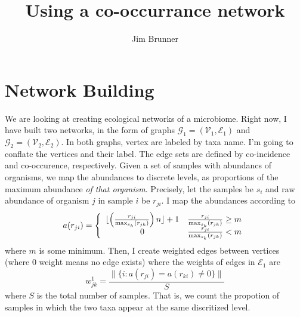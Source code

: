 \documentclass[10pt]{article}
\author{Jim Brunner}
\title{Using a co-occurrance network}
\theoremstyle{definition}
\numberwithin{theorem}{section}
\numberwithin{definition}{section}
\numberwithin{lemma}{section}
\numberwithin{corollary}{section}
\numberwithin{clm}{section}
\numberwithin{rmk}{section}
\newcommand{\cE}{\mathcal{E}}
\newcommand{\cG}{\mathcal{G}}
\newcommand{\cV}{\mathcal{V}}
\begin{document}
\maketitle
\section{Network Building}
We are looking at creating ecological networks of a microbiome. Right now, I have built two networks, in the form of graphs $\cG_1 = (\cV_1, \cE_1)$ and $\cG_2 = (\cV_2,\cE_2)$. In both graphs, vertex are labeled by taxa name. I'm going to conflate the vertices and their label. The edge sets are defined by co-incidence and co-occurence, respectively. Given a set of samples with abundancs of organisms, we map the abundances to discrete levels, as proportions of the maximum abundance \emph{of that organism}. Precisely, let the samples be $s_i$ and raw abundance of organism $j$ in sample $i$ be $r_{ji}$. I map the abundances according to
\[
a(r_{ji})  = \left\{
\begin{array}{c c}
\lfloor\left(\frac{r_{ji}}{\max_{s_k}(r_{jk})}\right) n \rfloor + 1 &  \frac{r_{ji}}{\max_{s_k}(r_{jk})} \geq m \\
0 & \frac{r_{ji}}{\max_{s_k}(r_{jk})} < m
\end{array}
\right.
\]
where $m$ is some minimum. Then, I create weighted edges between vertices (where $0$ weight means no edge exists) where the weights of edges in $\cE_1$ are
\[
w^1_{jk} = \frac{\|\{i: a(r_{ji}) = a(r_{ki}) \neq 0\} \|}{S}
\]
where $S$ is the total number of samples. That is, we count the propotion of samples in which the two taxa appear at the same discritized level. 
\end{document}
